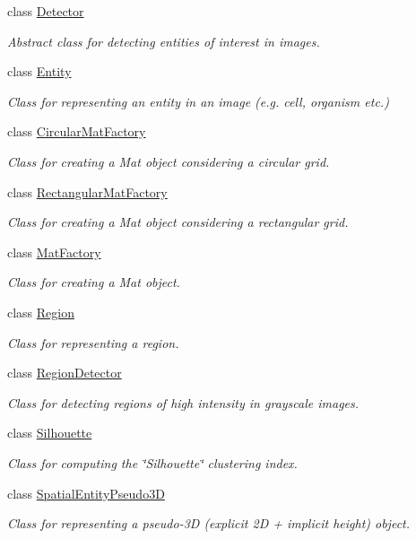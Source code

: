\begin{DoxyCompactItemize}
class \hyperlink{classmultiscale_1_1analysis_1_1Detector}{Detector}
\begin{DoxyCompactList}\small\item\em Abstract class for detecting entities of interest in images. \end{DoxyCompactList}\item 
class \hyperlink{classmultiscale_1_1analysis_1_1Entity}{Entity}
\begin{DoxyCompactList}\small\item\em Class for representing an entity in an image (e.\-g. cell, organism etc.) \end{DoxyCompactList}\item 
class \hyperlink{classmultiscale_1_1analysis_1_1CircularMatFactory}{Circular\-Mat\-Factory}
\begin{DoxyCompactList}\small\item\em Class for creating a Mat object considering a circular grid. \end{DoxyCompactList}\item 
class \hyperlink{classmultiscale_1_1analysis_1_1RectangularMatFactory}{Rectangular\-Mat\-Factory}
\begin{DoxyCompactList}\small\item\em Class for creating a Mat object considering a rectangular grid. \end{DoxyCompactList}\item 
class \hyperlink{classmultiscale_1_1analysis_1_1MatFactory}{Mat\-Factory}
\begin{DoxyCompactList}\small\item\em Class for creating a Mat object. \end{DoxyCompactList}\item 
class \hyperlink{classmultiscale_1_1analysis_1_1Region}{Region}
\begin{DoxyCompactList}\small\item\em Class for representing a region. \end{DoxyCompactList}\item 
class \hyperlink{classmultiscale_1_1analysis_1_1RegionDetector}{Region\-Detector}
\begin{DoxyCompactList}\small\item\em Class for detecting regions of high intensity in grayscale images. \end{DoxyCompactList}\item 
class \hyperlink{classmultiscale_1_1analysis_1_1Silhouette}{Silhouette}
\begin{DoxyCompactList}\small\item\em Class for computing the \char`\"{}\-Silhouette\char`\"{} clustering index. \end{DoxyCompactList}\item 
class \hyperlink{classmultiscale_1_1analysis_1_1SpatialEntityPseudo3D}{Spatial\-Entity\-Pseudo3\-D}
\begin{DoxyCompactList}\small\item\em Class for representing a pseudo-\/3\-D (explicit 2\-D + implicit height) object. \end{DoxyCompactList}\end{DoxyCompactItemize}
